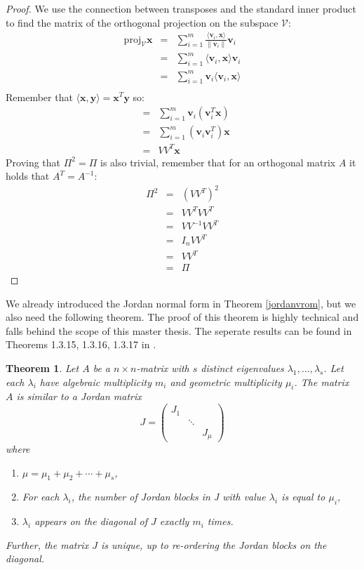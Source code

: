 \documentclass[a4paper,11pt]{report}
\newtheorem{theorem}{Theorem}[section]
\begin{document}
\begin{proof}
We use the connection between transposes and the standard inner product to find the matrix of the 
    orthogonal projection on the subspace $\mathcal{V}$:
  \begin{eqnarray*}
    \text{proj}_\mathcal{V}\mathbf{x} &=& \sum_{i=1}^{m} \frac{ \langle\mathbf{v}_i,\mathbf{x} \rangle}{\|\mathbf{v}_i\|}\mathbf{v}_i\\
  &=& \sum_{i=1}^{m} \langle\mathbf{v}_i,\mathbf{x}\rangle\mathbf{v}_i\\
  &=& \sum_{i=1}^{m} \mathbf{v}_i\langle\mathbf{v}_i,\mathbf{x}\rangle\\
  \end{eqnarray*}
  Remember that $\langle \mathbf{x}, \mathbf{y} \rangle = \mathbf{x}^T\mathbf{y}$ 
  so:
   \begin{eqnarray*}
  &=& \sum_{i=1}^{m} \mathbf{v}_i(\mathbf{v}_i^T\mathbf{x})\\
  &=& \sum_{i=1}^{m} (\mathbf{v}_i\mathbf{v}_i^T)\mathbf{x}\\
  &=& VV^T\mathbf{x}
  \end{eqnarray*}
Proving that $\Pi^2 =\Pi$ is also trivial, remember that for an orthogonal matrix $A$ it holds that $A^T = A^{-1}$:
  \begin{eqnarray*}
 \Pi^2 &=& (VV^T)^2\\
  &=& VV^TVV^T\\
  &=& VV^{-1}VV^T\\
  &=& I_nVV^T\\
  &=& VV^T\\
  &=& \Pi
  \end{eqnarray*}
\end{proof}

We already introduced the Jordan normal form in Theorem \ref{jordanvrom}, but we 
also need the following theorem. The proof of this theorem is highly technical 
and falls behind the scope of this master thesis. The seperate results can be 
found in Theorems 1.3.15, 1.3.16, 1.3.17 in \cite{kieboom}.

\begin{theorem}\label{geschenkuitdehemel}
  Let $A$ be a $n\times n$-matrix with $s$ distinct eigenvalues $\lambda_1, \ldots, 
  \lambda_s$. Let each $\lambda_i$ have algebraic multiplicity $m_i$ and 
  geometric multiplicity $\mu_i$. The matrix $A$ is similar to a Jordan matrix
  $$J = \begin{pmatrix}
  J_1 & & \\
  & \ddots &\\
  && J_\mu
  \end{pmatrix}$$
  where
  \begin{enumerate}
    \item $\mu = \mu_1 + \mu_2 + \cdots + \mu_s$,
        \item For each $\lambda_i$, the number of Jordan blocks in J with value $\lambda_i$ 
    is equal to $\mu_i$,
    \item $\lambda_i$ appears on the diagonal of $J$ exactly $m_i$ times.
  \end{enumerate}
  Further, the matrix $J$ is unique, up to re-ordering the Jordan blocks on the 
  diagonal.
\end{theorem}
\end{document}
